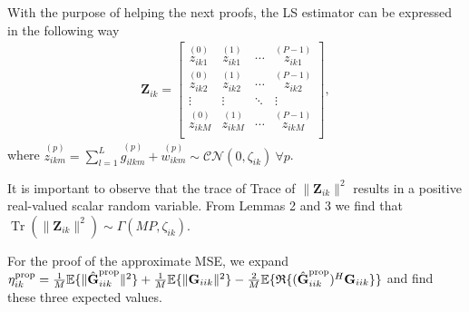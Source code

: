 \documentclass[journal,12pt,onecolumn]{IEEEtran}
\DeclareMathOperator{\Tr}{Tr}
\begin{document}
With the purpose of helping the next proofs, the LS estimator can be expressed in the following way
\begin{equation}\label{eq:redefinition_of_z}
\begin{split}
\textbf{Z}_{ik} = \left[\begin{array}{cccc}
\overset{(0)}{{z}_{ik1}} & \overset{(1)}{{z}_{ik1}} & \cdots & \overset{(P-1)}{{z}_{ik1}} \\
\overset{(0)}{{z}_{ik2}} & \overset{(1)}{{z}_{ik2}} & \cdots & \overset{(P-1)}{{z}_{ik2}} \\
\vdots & \vdots & \ddots & \vdots \\
\overset{(0)}{{z}_{ikM}} & \overset{(1)}{{z}_{ikM}} & \cdots & \overset{(P-1)}{{z}_{ikM}} \\ \end{array} \right],
\end{split}
\end{equation}
where $\overset{(p)}{{z}_{ikm}} = \sum_{l=1}^{L} \overset{(p)}{g_{ilkm}} +  \overset{(p)}{w_{ikm}} \sim \mathcal{CN}(0,\zeta_{ik}) \ \forall p$.


It is important to observe that the trace of Trace of $\lVert \textbf{Z}_{ik} \rVert^{2}$ results in a positive real-valued scalar random variable. From Lemmas 2 and 3 we find that $\Tr ( \lVert \textbf{Z}_{ik} \rVert^{2} ) \sim \Gamma(MP,\zeta_{ik})$.

For the proof of the approximate MSE, we expand $\eta_{ik}^{\text{\text{prop}}} = \frac{1}{M}\mathbb{E}\{ \lVert \hat{\textbf{G}}_{iik}^{\text{prop}} \rVert^{2} \} + \frac{1}{M}\mathbb{E}\{ \lVert \textbf{G}_{iik} \rVert^{2} \} - \frac{2}{M}\mathbb{E} \{\mathfrak{R}\{ (\hat{\textbf{G}}_{iik}^{\text{prop}})^{H} \textbf{G}_{iik} \}\}$ and find these three expected values.
\end{document}
